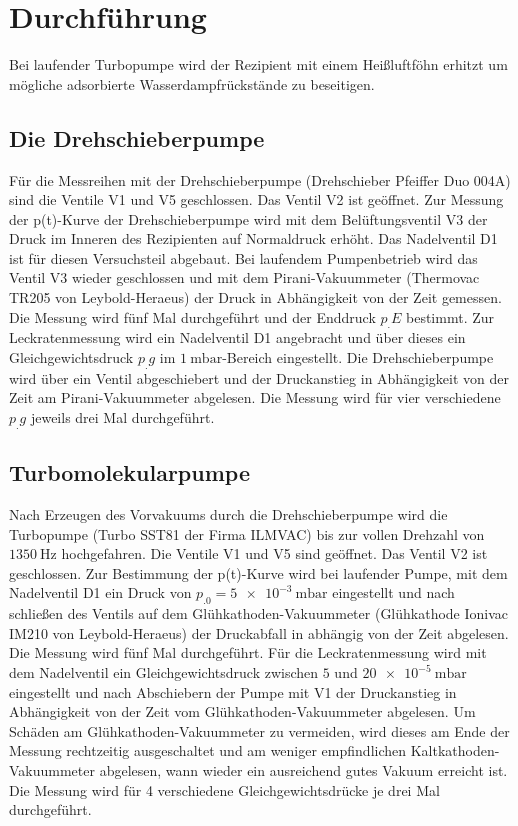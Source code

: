 \section{Durchführung}
\label{sec:Durchführung}

Bei laufender Turbopumpe wird der Rezipient mit einem Heißluftföhn erhitzt um mögliche adsorbierte Wasserdampfrückstände zu beseitigen.

\subsection{Die Drehschieberpumpe}

Für die Messreihen mit der Drehschieberpumpe (Drehschieber Pfeiffer Duo 004A) sind die Ventile V1 und V5 geschlossen. Das Ventil V2 ist geöffnet.
Zur Messung der p(t)-Kurve der Drehschieberpumpe wird mit dem Belüftungsventil V3 der Druck im Inneren des Rezipienten auf Normaldruck erhöht. Das Nadelventil D1 ist für diesen Versuchsteil abgebaut. Bei laufendem Pumpenbetrieb wird das Ventil V3 wieder geschlossen und mit dem Pirani-Vakuummeter (Thermovac TR205 von Leybold-Heraeus) der Druck in Abhängigkeit von der Zeit gemessen.
Die Messung wird fünf Mal durchgeführt und der Enddruck $p_.E$ bestimmt.\newline
Zur Leckratenmessung wird ein Nadelventil D1 angebracht und über dieses ein Gleichgewichtsdruck $p_.g$ im $\SI{1}{\milli\bar}$-Bereich eingestellt. Die Drehschieberpumpe wird über ein Ventil abgeschiebert und der Druckanstieg in Abhängigkeit von der Zeit am Pirani-Vakuummeter abgelesen.
Die Messung wird für vier verschiedene $p_.g$ jeweils drei Mal durchgeführt.

\subsection{Turbomolekularpumpe}

Nach Erzeugen des Vorvakuums durch die Drehschieberpumpe wird die Turbopumpe (Turbo SST81 der Firma ILMVAC) bis zur vollen Drehzahl von $\SI{1350}{\hertz}$ hochgefahren.
Die Ventile V1 und V5 sind geöffnet. Das Ventil V2 ist geschlossen.
Zur Bestimmung der p(t)-Kurve wird bei laufender Pumpe, mit dem Nadelventil D1 ein Druck von $p_.0=\SI{5e-3}{\milli\bar}$ eingestellt und nach schließen des Ventils auf dem Glühkathoden-Vakuummeter (Glühkathode Ionivac IM210 von Leybold-Heraeus) der Druckabfall in abhängig von der Zeit abgelesen. Die Messung wird fünf Mal durchgeführt.\newline
Für die Leckratenmessung wird mit dem Nadelventil ein Gleichgewichtsdruck zwischen $5$ und $\SI{20e-5}{\milli\bar}$ eingestellt und nach Abschiebern der Pumpe mit V1 der Druckanstieg in Abhängigkeit von der Zeit vom Glühkathoden-Vakuummeter abgelesen. Um Schäden am Glühkathoden-Vakuummeter zu vermeiden, wird dieses am Ende der Messung rechtzeitig ausgeschaltet und am weniger empfindlichen Kaltkathoden-Vakuummeter abgelesen, wann wieder ein ausreichend gutes Vakuum erreicht ist. Die Messung wird für 4 verschiedene Gleichgewichtsdrücke je drei Mal durchgeführt.


